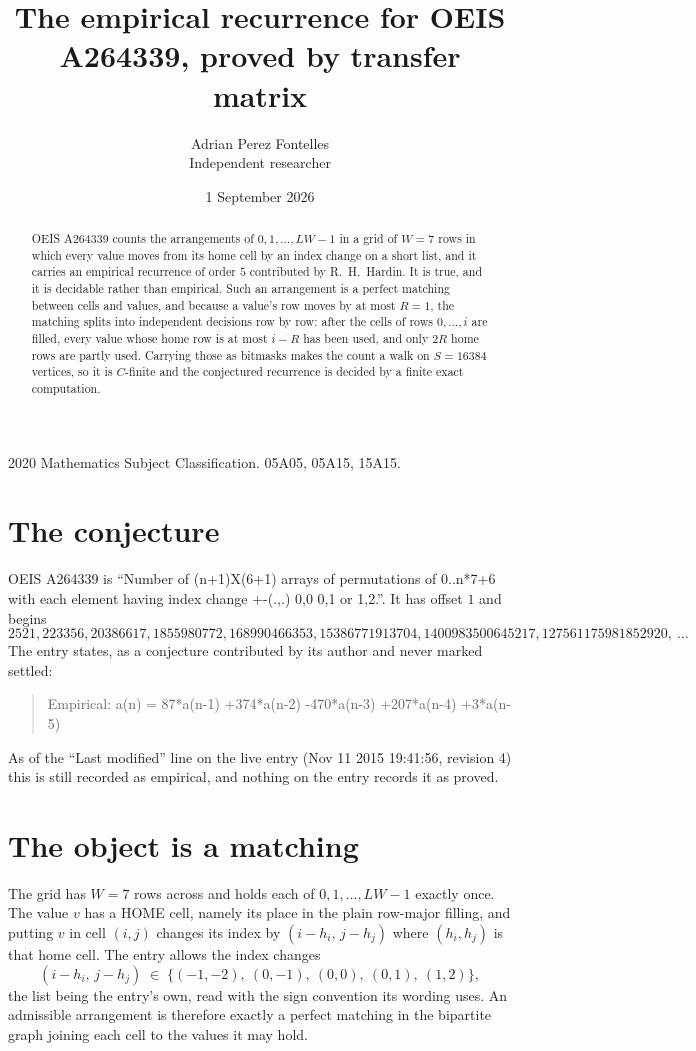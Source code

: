 \documentclass[11pt,a4paper]{article}
\title{The empirical recurrence for OEIS A264339, proved by transfer matrix}
\author{Adrian Perez Fontelles\\ \small Independent researcher}
\date{1 September 2026}
\theoremstyle{plain}
\theoremstyle{definition}
\begin{document}
\maketitle

\begin{abstract}
OEIS A264339 counts the arrangements of $0,1,\dots,LW-1$ in a grid of $W=7$ rows in which
every value moves from its home cell by an index change on a short list, and it carries an
empirical recurrence of order $5$ contributed by R.~H.~Hardin. It is true, and it is
decidable rather than empirical. Such an arrangement is a perfect matching between cells and
values, and because a value's row moves by at most $R=1$, the matching splits into
independent decisions row by row: after the cells of rows $0,\dots,i$ are filled,
every value whose home row is at most $i-R$ has been used, and only $2R$ home rows are
partly used. Carrying those as bitmasks makes the count a walk on $S=16384$ vertices, so it is
$C$-finite and the conjectured recurrence is decided by a finite exact computation.
\end{abstract}

\noindent\small 2020 Mathematics Subject Classification. 05A05, 05A15, 15A15.\normalsize

\section{The conjecture}

OEIS A264339 is ``Number of (n+1)X(6+1) arrays of permutations of 0..n*7+6 with each element having index change +-(.,.) 0,0 0,1 or 1,2.''. It has offset $1$ and begins
\[
2521, 223356, 20386617, 1855980772, 168990466353, 15386771913704, 1400983500645217, 127561175981852920,\ \dots
\]
The entry states, as a conjecture contributed by its author and never marked settled:
\begin{quote}
Empirical: a(n) = 87*a(n-1) +374*a(n-2) -470*a(n-3) +207*a(n-4) +3*a(n-5)
\end{quote}
As of the ``Last modified'' line on the live entry (Nov 11 2015 19:41:56, revision 4) this is still
recorded as empirical, and nothing on the entry records it as proved.

\section{The object is a matching}

The grid has $W=7$ rows across and holds each of $0,1,\dots,LW-1$ exactly once. The value
$v$ has a HOME cell, namely its place in the plain row-major filling, and putting $v$ in cell
$(i,j)$ changes its index by $(i-h_i,\,j-h_j)$ where $(h_i,h_j)$ is that home cell. The entry
allows the index changes
\[
(i-h_i,\,j-h_j)\;\in\;\{(-1,-2),\ (0,-1),\ (0,0),\ (0,1),\ (1,2)\},
\]
the list being the entry's own, read with the sign convention its wording uses. An admissible
arrangement is therefore exactly a perfect matching in the bipartite graph joining each cell to
the values it may hold.
\end{document}

